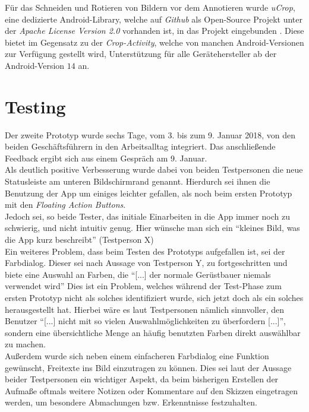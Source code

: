 Für das Schneiden und Rotieren von Bildern vor dem Annotieren wurde \emph{uCrop}, eine dedizierte Android-Library, welche auf \emph{Github} als Open-Source Projekt unter der \emph{Apache License Version 2.0} vorhanden ist, in das Projekt eingebunden \citep{UC18}.
Diese bietet im Gegensatz zu der \emph{Crop-Activity}, welche von manchen Android-Versionen zur Verfügung gestellt wird, Unterstützung für alle Gerätehersteller ab der Android-Version $14$ an.

\section{Testing}\label{sec:test2}
Der zweite Prototyp wurde sechs Tage, vom 3. bis zum 9. Januar 2018, von den beiden Geschäftsführern in den Arbeitsalltag integriert.
Das anschließende Feedback ergibt sich aus einem Gespräch am 9. Januar. \\

Als deutlich positive Verbesserung wurde dabei von beiden Testpersonen die neue Statusleiste am unteren Bildschirmrand genannt.
Hierdurch sei ihnen die Benutzung der App um einiges leichter gefallen, als noch beim ersten Prototyp mit den \emph{Floating Action Buttons}. \\

Jedoch sei, so beide Tester, das initiale Einarbeiten in die App immer noch zu schwierig, und nicht intuitiv genug.
Hier wünsche man sich ein ``kleines Bild, was die App kurz beschreibt'' (Testperson X) \\

Ein weiteres Problem, dass beim Testen des Prototyps aufgefallen ist, sei der Farbdialog.
Dieser sei nach Aussage von Testperson Y, zu fortgeschritten und biete eine Auswahl an Farben, die ``[...] der normale Gerüstbauer niemals verwendet wird'' 
Dies ist ein Problem, welches während der Test-Phase zum ersten Prototyp nicht als solches identifiziert wurde, sich jetzt doch als ein solches herausgestellt hat.
Hierbei wäre es laut Testpersonen nämlich sinnvoller, den Benutzer ``[...] nicht mit so vielen Auswahlmöglichkeiten zu überfordern [...]'', sondern eine übersichtliche Menge an häufig benutzten Farben direkt auswählbar zu machen. \\

Außerdem wurde sich neben einem einfacheren Farbdialog eine Funktion gewünscht, Freitexte ins Bild einzutragen zu können. 
Dies sei laut der Aussage beider Testpersonen ein wichtiger Aspekt, da beim bisherigen Erstellen der Aufmaße oftmals weitere Notizen oder Kommentare auf den Skizzen eingetragen werden, um besondere Abmachungen bzw. Erkenntnisse festzuhalten. \\

